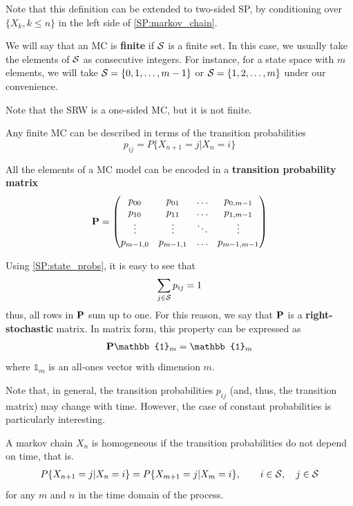 Note that this definition can be extended to two-sided SP, by conditioning over $\{X_k, k\le n\}$ in the left side of \eqref{SP:markov_chain}.

We will say that an MC is \textbf{finite} if ${\cal S}$ is a finite set. In this case, we usually take the elements of ${\cal S}$ as consecutive integers. For instance, for a state space with $m$ elements, we will take ${\cal S} = \{0, 1, \ldots, m-1\}$ or ${\cal S} = \{1, 2, \ldots, m\}$ under our convenience.

Note that the SRW is a one-sided MC, but it is not finite. 

Any finite MC can be described in terms of the transition probabilities
\begin{equation}
\label{SP:state_probs}
p_{ij} = P\{X_{n+1}=j| X_n=i\}
\end{equation}

All the elements of a MC model can be encoded in a \textbf{transition probability matrix}
\begin{align}
{\bf P} = 
\begin{pmatrix}
p_{00} & p_{01} & \ldots & p_{0,m-1}  \\
p_{10} & p_{11} & \ldots & p_{1,m-1}  \\
\vdots & \vdots & \ddots & \vdots  \\
p_{m-1,0} & p_{m-1,1} & \ldots & p_{m-1,m-1} 
\end{pmatrix}
\end{align}

Using \eqref{SP:state_probs}, it is easy to see that
\begin{align}
\sum_{j \in {\cal S}} p_{ij} = 1
\end{align}
thus, all rows in ${\bf P}$ sum up to one. For this reason, we say that ${\bf P}$ is a \textbf{right-stochastic} matrix. In matrix form, this property can be expressed as
\begin{align}
{\bf P}\mathbb{1}_m = \mathbb{1}_m
\label{sp:psum1}
\end{align}
where $\mathbb{1}_m$ is an all-ones vector with dimension $m$.

Note that, in general, the transition probabilities $p_{ij} $ (and, thus, the transition matrix) may change with time. However, the case of constant probabilities is particularly interesting.

\begin{definition}
A markov chain $X_n$ is homogeneous if the transition probabilities do not depend on time, that is.
\begin{align}
P\{X_{n+1}=j| X_n=i\} = P\{X_{m+1}=j| X_m=i\},   \qquad i \in {\cal S},\quad  j \in {\cal S} 
\end{align}
for any $m$ and $n$ in the time domain of the process.
\end{definition}


